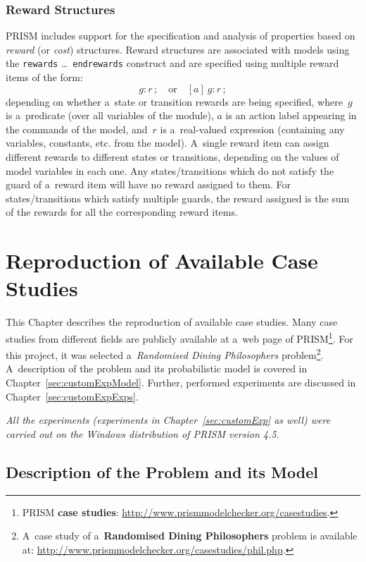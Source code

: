 \documentclass[a4paper, 11pt]{article}
\theoremstyle{definition}
\begin{document}
\subsubsection{Reward Structures}

PRISM includes support for the specification and analysis of properties
based on \emph{reward} (or \emph{cost}) structures. Reward structures are
associated with models using the \texttt{rewards}
 \ldots\ \texttt{endrewards} construct
and are specified using multiple reward items of the form:
$$
    g : r\,; \quad \text{or} \quad [a]\ g : r\,;
$$
depending on whether a~state or transition rewards are being specified,
where~$ g $ is a~predicate (over all variables of the module), $ a $ is
an action label appearing in the commands of the model, and~$ r $ is
a~real-valued expression (containing any variables, constants, etc.
from the model). A~single reward item can assign different rewards to
different states or transitions, depending on the values of model
variables in each one. Any states/transitions which do not satisfy the
guard of a~reward item will have no reward assigned to them. For
states/transitions which satisfy multiple guards, the reward assigned is
the sum of the rewards for all the corresponding reward items.


\section{Reproduction of Available Case Studies}
\label{sec:caseStud}

This Chapter describes the reproduction of available case studies. Many
case studies from different fields are publicly available at a~web
page of PRISM\footnote{PRISM \textbf{case studies}:
\url{http://www.prismmodelchecker.org/casestudies}.}. For this project, it
was selected a~\emph{Randomised Dining Philosophers} problem\footnote{A~case
study of a~\textbf{Randomised Dining Philosophers} problem is available at:
\url{http://www.prismmodelchecker.org/casestudies/phil.php}.}.
A~description of the problem and its probabilistic model is covered in
Chapter~\ref{sec:customExpModel}. Further, performed experiments are
discussed in Chapter~\ref{sec:customExpExps}.

\emph{All the experiments (experiments in Chapter~\ref{sec:customExp} as
well) were carried out on the Windows distribution of PRISM version 4.5.}

\subsection{Description of the Problem and its Model}
\label{sec:caseStudModel}
\end{document}
